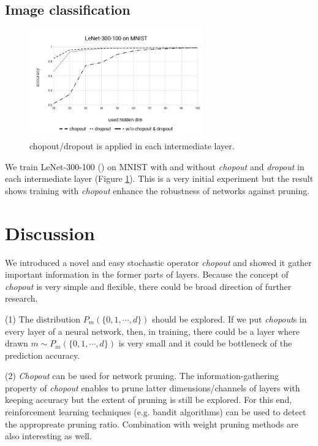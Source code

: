 \documentclass{article}
\begin{document}
    \subsection{Image classification}
    
    \begin{figure}
    \centering
    \includegraphics[clip, width=75mm]{lenet-300-100_mnist.png}
    \caption{chopout/dropout is applied in each intermediate layer.}
    \label{fig:lenet-300-100_mnist}
    \end{figure}
    
    We train LeNet-300-100 (\citet{lecun1998gradient}) on MNIST with and without \textit{chopout} and \textit{dropout} in each intermediate layer (Figure \ref{fig:lenet-300-100_mnist}). This is a very initial experiment but the result shows training with \textit{chopout} enhance the robustness of networks against pruning.
    
    \section{Discussion}
    We introduced a novel and easy stochastic operator \textit{chopout} and showed it gather important information in the former parts of layers. Because the concept of \textit{chopout} is very simple and flexible, there could be broad direction of further research.

    (1) The distribution $P_m(\{0, 1, \cdots, d\})$ should be explored. If we put \textit{chopout}s in every layer of a neural network, then, in training, there could be a layer where drawn $m \sim P_m(\{0, 1, \cdots, d\})$ is very small and it could be bottleneck of the prediction accuracy.
    
    (2) \textit{Chopout} can be used for network pruning. The information-gathering property of \textit{chopout} enables to prune latter dimensions/channels of layers with keeping accuracy but the extent of pruning is still be explored. For this end, reinforcement learning techniques (e.g. bandit algorithms) can be used to detect the appropreate pruning ratio. Combination with weight pruning methods are also interesting as well.

    
    
    
        
    
    
    
    
\end{document}
